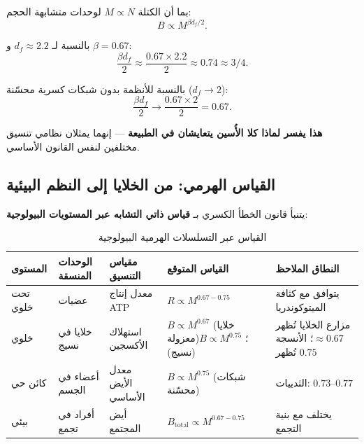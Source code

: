 \documentclass[11pt,a4paper]{article}
\begin{document}
	بما أن الكتلة \(M \propto N\) لوحدات متشابهة الحجم:
	\begin{equation}
		B \propto M^{\beta d_f/2}.
	\end{equation}
	
	بالنسبة لـ \(d_f \approx 2.2\) و \(\beta = 0.67\):
	\begin{equation}
		\frac{\beta d_f}{2} \approx \frac{0.67 \times 2.2}{2} \approx 0.74 \approx 3/4.
	\end{equation}
	
	بالنسبة للأنظمة بدون شبكات كسرية محسّنة (\(d_f \to 2\)):
	\begin{equation}
		\frac{\beta d_f}{2} \to \frac{0.67 \times 2}{2} = 0.67.
	\end{equation}
	
	\textbf{هذا يفسر لماذا كلا الأُسين يتعايشان في الطبيعة} — إنهما يمثلان نظامي تنسيق مختلفين لنفس القانون الأساسي.
	
	\subsection{القياس الهرمي: من الخلايا إلى النظم البيئية}
	
	يتنبأ قانون الخطأ الكسري بـ \textbf{قياس ذاتي التشابه عبر المستويات البيولوجية}:
	
	\begin{table}[htbp]
		\centering
		\caption{القياس عبر التسلسلات الهرمية البيولوجية}
		\label{tab:hierarchical-scaling}
		\begin{tabular}{p{3cm} p{3cm} p{3.5cm} p{2.5cm} p{3cm}}
			\toprule
			\textbf{المستوى} & \textbf{الوحدات المنسقة} & \textbf{مقياس التنسيق} & \textbf{القياس المتوقع} & \textbf{النطاق الملاحظ} \\
			\midrule
			تحت خلوي & عضيات & معدل إنتاج ATP & \(R \propto M^{0.67-0.75}\) & يتوافق مع كثافة الميتوكوندريا \cite{West2002} \\
			خلوي & خلايا في نسيج & استهلاك الأكسجين & \(B \propto M^{0.67}\) (خلايا معزولة)؛ \(B \propto M^{0.75}\) (نسيج) & مزارع الخلايا تُظهر \(\approx 0.67\)؛ الأنسجة تُظهر \(0.75\) \cite{West2002} \\
			كائن حي & أعضاء في الجسم & معدل الأيض الأساسي & \(B \propto M^{0.75}\) (شبكات محسّنة) & الثدييات: \(0.73\)–\(0.77\) \cite{Kleiber1932} \\
			بيئي & أفراد في تجمع & أيض المجتمع & \(B_{\text{total}} \propto M^{0.67-0.75}\) & يختلف مع بنية التجمع \cite{Glazier2005} \\
			\bottomrule
		\end{tabular}
	\end{table}
	
\end{document}
